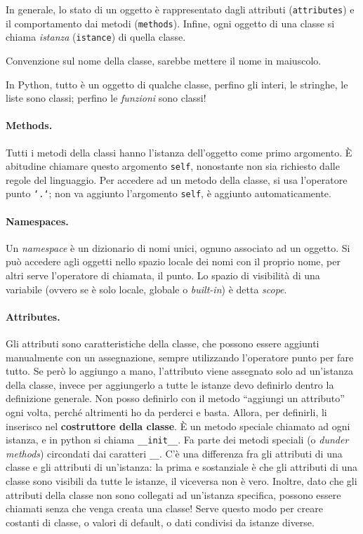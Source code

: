\documentclass[10pt, a4paper, titlepage]{book}
\begin{document}
In generale, lo stato di un oggetto è rappresentato dagli attributi (\texttt{attributes}) e il comportamento dai metodi (\texttt{methods}).
Infine, ogni oggetto di una classe si chiama \textit{istanza} (\texttt{istance}) di quella classe.

Convenzione sul nome della classe, sarebbe mettere il nome in maiuscolo.

In Python, tutto è un oggetto di qualche classe, perfino gli interi, le stringhe, le liste sono classi; perfino le \textit{funzioni} sono classi!

\paragraph{Methods.} Tutti i metodi della classi hanno l'istanza dell'oggetto come primo argomento. È abitudine chiamare questo argomento \texttt{self}, nonostante non sia richiesto dalle regole del linguaggio.
Per accedere ad un metodo della classe, si usa l'operatore punto \texttt{`.`}; non va aggiunto l'argomento \texttt{self}, è aggiunto automaticamente.

\paragraph{Namespaces.} Un \textit{namespace} è un dizionario di nomi unici, ognuno associato ad un oggetto. Si può accedere agli oggetti nello spazio locale dei nomi con il proprio nome, per altri serve l'operatore di chiamata, il punto. Lo spazio di visibilità di una variabile (ovvero se è solo locale, globale o \textit{built-in}) è detta \textit{scope}. 

\paragraph{Attributes.} Gli attributi sono caratteristiche della classe, che possono essere aggiunti manualmente con un assegnazione, sempre utilizzando l'operatore punto per fare tutto. Se però lo aggiungo a mano, l'attributo viene assegnato solo ad un'istanza della classe, invece per aggiungerlo a tutte le istanze devo definirlo dentro la definizione generale.
Non posso definirlo con il metodo ``aggiungi un attributo'' ogni volta, perché altrimenti ho da perderci e basta. Allora, per definirli, li inserisco nel \textbf{costruttore della classe}. È un metodo speciale chiamato ad ogni istanza, e in python si chiama \texttt{__init__}. Fa parte dei metodi speciali (o \textit{dunder methods}) circondati dai caratteri \texttt{\_\_}.
C'è una differenza fra gli attributi di una classe e gli attributi di un'istanza: la prima e sostanziale è che gli attributi di una classe sono visibili da tutte le istanze, il viceversa non è vero. Inoltre, dato che gli attributi della classe non sono collegati ad un'istanza specifica, possono essere chiamati senza che venga creata una classe! Serve questo modo per creare costanti di classe, o valori di default, o dati condivisi da istanze diverse.
\end{document}
